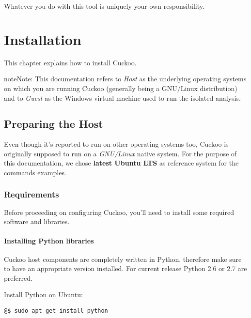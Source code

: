 \documentclass[letterpaper,10pt,english]{sphinxmanual}
\begin{document}
Whatever you do with this tool is uniquely your own responsibility.


\section{Installation}
\label{installation/index:installation}\label{installation/index::doc}
This chapter explains how to install Cuckoo.

\begin{notice}{note}{Note:}
This documentation refers to \emph{Host} as the underlying operating systems on
which you are running Cuckoo (generally being a GNU/Linux distribution) and
to \emph{Guest} as the Windows virtual machine used to run the isolated analysis.
\end{notice}


\subsection{Preparing the Host}
\label{installation/host/index:preparing-the-host}\label{installation/host/index::doc}
Even though it's reported to run on other operating systems too, Cuckoo is
originally supposed to run on a \emph{GNU/Linux} native system.
For the purpose of this documentation, we chose \textbf{latest Ubuntu LTS} as
reference system for the commands examples.


\subsubsection{Requirements}
\label{installation/host/requirements:requirements}\label{installation/host/requirements::doc}
Before proceeding on configuring Cuckoo, you'll need to install some required
software and libraries.


\paragraph{Installing Python libraries}
\label{installation/host/requirements:installing-python-libraries}
Cuckoo host components are completely written in Python, therefore make sure to
have an appropriate version installed. For current release Python 2.6 or 2.7 are
preferred.

Install Python on Ubuntu:

\begin{Verbatim}[commandchars=@\[\]]
@$ sudo apt-get install python
\end{Verbatim}
\end{document}
